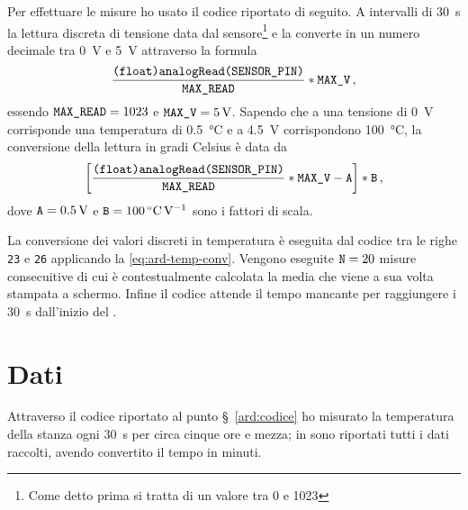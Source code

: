             Per effettuare le misure ho usato il codice riportato di seguito. A intervalli di \SI{30}{\second} la lettura discreta di tensione data dal sensore\footnote{Come detto prima si tratta di un valore tra \num{0} e \num{1023}} e la converte in un numero decimale tra \SI{0}{\volt} e \SI{5}{V} attraverso la formula
            \begin{equation*}
                \frac{\text{\ttfamily (float)analogRead(SENSOR\_PIN)}}{\text{\ttfamily MAX\_READ}} * \text{\ttfamily MAX\_V}
                \,,
            \end{equation*}
            essendo $\text{\ttfamily MAX\_READ} = 1023$ e $\text{\ttfamily MAX\_V} = \SI{5}{\volt}$. Sapendo che a una tensione di \SI{0}{\volt} corrisponde una temperatura di \SI{0.5}{\celsius} e a \SI{4.5}{\volt} corrispondono \SI{100}{\celsius}, la conversione della lettura in gradi Celsius è data da
            \begin{equation}
                \bqty{\frac{\text{\ttfamily (float)analogRead(SENSOR\_PIN)}}{\text{\ttfamily MAX\_READ}} * \text{\ttfamily MAX\_V} - \text{\ttfamily A}} * \text{\ttfamily B}
                \mycomma
                \label{eq:ard-temp-conv}
            \end{equation}
            dove $\text{\ttfamily A} = \SI{0.5}{\volt}$ e $\text{\ttfamily B} = \SI{100}{\celsius\per\volt}$ sono i fattori di scala.

            La conversione dei valori discreti in temperatura è eseguita dal codice tra le righe \texttt{23} e \texttt{26} applicando la \eqref{eq:ard-temp-conv}. Vengono eseguite $\text{\ttfamily N} = 20$ misure consecuitive di cui è contestualmente calcolata la media che viene a sua volta stampata a schermo. Infine il codice attende il tempo mancante per raggiungere i \SI{30}{\second} dall'inizio del \txtloop.
            

    \section{Dati}
        Attraverso il codice riportato al punto \S~\ref{ard:codice} ho misurato la temperatura della stanza ogni \SI{30}{s} per circa cinque ore e mezza; in  sono riportati tutti i dati raccolti, avendo convertito il tempo in minuti.


